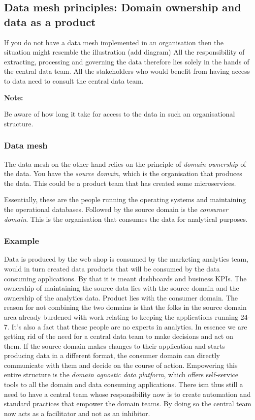 \documentclass[a4paper, 11pt]{book}
\newenvironment{note}{
    \begin{siderule}
        \textbf{Note: }
        }{
    \end{siderule}}
\begin{document}
    \subsection{Data mesh principles: Domain ownership and data as a product}
    If you do not have a data mesh implemented in an organisation then the situation might resemble the illustration (add diagram)
    All the responsibility of extracting, processing and governing the data therefore lies solely in the hands of the central data team.
    All the stakeholders who would benefit from having access to data need to consult the central data team.

    \begin{note}
        Be aware of how long it take for access to the data in such an organisational structure.
    \end{note}

    \subsubsection{Data mesh}
    The data mesh on the other hand relies on the principle of \textit{domain ownership} of the data.
    You have the \textit{source domain}, which is the organisation that produces the data.
    This could be a product team that has created some microservices.

    Essentially, these are the people running the operating systems and maintaining the operational databases.
    Followed by the source domain is the \textit{consumer domain}.
    This is the organisation that consumes the data for analytical purposes.

    \subsubsection{Example}
    Data is produced by the web shop is consumed by the marketing analytics team, would in turn created data products that will be consumed by the data consuming applications.
    By that it is meant dashboards and business KPIs.
    The ownership of maintaining the source data lies with the source domain and the ownership of the analytics data.
    Product lies with the consumer domain.
    The reason for not combining the two domains is that the folks in the source domain area already burdened with work relating to keeping the applications running 24-7.
    It's also a fact that these people are no experts in analytics.
    In essence we are getting rid of the need for a central data team to make decisions and act on them.
    If the source domain makes changes to their application and starts producing data in a different format, the consumer domain can directly communicate with them and decide on the course of action.
    Empowering this entire structure is the \textit{domain agnostic data platform}, which offers self-service tools to all the domain and data consuming applications.
    There ism thus still a need to have a central team whose responsibility now is to create automation and standard practices that empower the domain teams.
    By doing so the central team now acts as a facilitator and not as an inhibitor.
\end{document}
